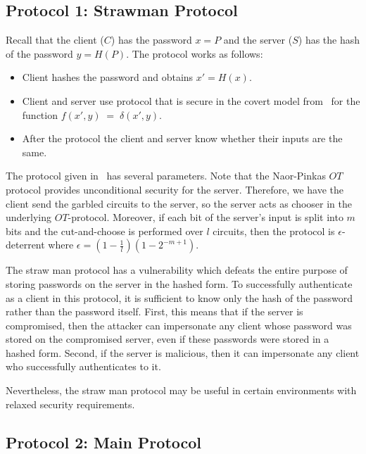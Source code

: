 \subsection{Protocol 1: Strawman Protocol}
\label{subsec:ssh-protocol-1}

Recall that the client ($C$) has the password $x=P$ and the server
($S$) has the hash of the password $y=H(P)$. The protocol works as
follows:
\begin{itemize}
\item Client hashes the password and obtains $x'=H(x)$.
\item Client and server use protocol that is secure in the covert
model from~\cite[Section 6.2]{aumannlindell} for the function $f(x',y)
\; = \; \delta (x',y)$.
\item After the protocol the client and server know whether their
inputs are the same.
\end{itemize}
The protocol given in~\cite{aumannlindell} has several
parameters. Note that the Naor-Pinkas $OT$ protocol provides
unconditional security for the server. Therefore, we have the client
send the garbled circuits to the server, so the server acts as chooser
in the underlying $OT$-protocol. Moreover, if each bit of the server's
input is split into $m$ bits and the cut-and-choose is performed over
$l$ circuits, then the protocol is $\epsilon$-deterrent where
$\epsilon = (1 - \frac{1}{l}) (1 - 2^{-m+1})$.

The straw man protocol has a vulnerability which defeats the entire
purpose of storing passwords on the server in the hashed form.  To
successfully authenticate as a client in this protocol, it is
sufficient to know only the hash of the password rather than the
password itself.  First, this means that if the server is compromised,
then the attacker can impersonate any client whose password was stored
on the compromised server, even if these passwords were stored in a
hashed form.  Second, if the server is malicious, then it can
impersonate any client who successfully authenticates to it.

Nevertheless, the straw man protocol may be useful in certain environments
with relaxed security requirements.



\subsection{Protocol 2: Main Protocol}
\label{sect:mainproto}

